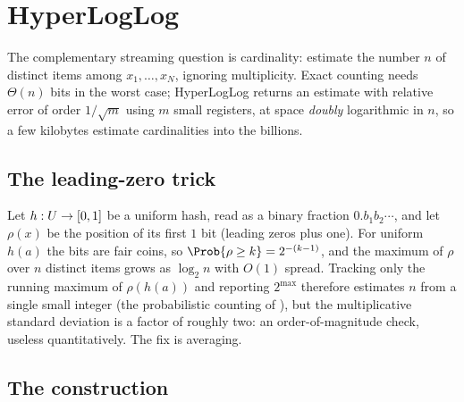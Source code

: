 %

\section{HyperLogLog}
\label{sec:hyperloglog}

The complementary streaming question is cardinality: estimate the number $n$
of distinct items among $x_1, \ldots, x_N$, ignoring multiplicity. Exact
counting needs $\Theta(n)$ bits in the worst case; HyperLogLog
returns an estimate with relative error of order $1/\sqrt{m}$ using $m$ small registers,
at space \emph{doubly} logarithmic in $n$, so a few kilobytes estimate
cardinalities into the billions.

\subsection*{The leading-zero trick}

Let $h : U \to [0,1]$ be a uniform hash, read as a binary fraction
$0.b_1 b_2 \cdots$, and let $\rho(x)$ be the position of its first $1$ bit
(leading zeros plus one). For uniform $h(a)$ the bits are fair coins, so
$\Prob{\rho \ge k} = 2^{-(k-1)}$, and the maximum of $\rho$ over $n$ distinct
items grows as $\log_2 n$ with $O(1)$ spread. Tracking only the running maximum
of $\rho(h(a))$ and reporting $2^{\max}$ therefore estimates $n$ from a single
small integer (the probabilistic counting of
\textcite{flajolet-martin-1985}), but the multiplicative standard deviation is a factor of roughly
two: an order-of-magnitude check, useless quantitatively. The fix is averaging.

\subsection*{The construction}

